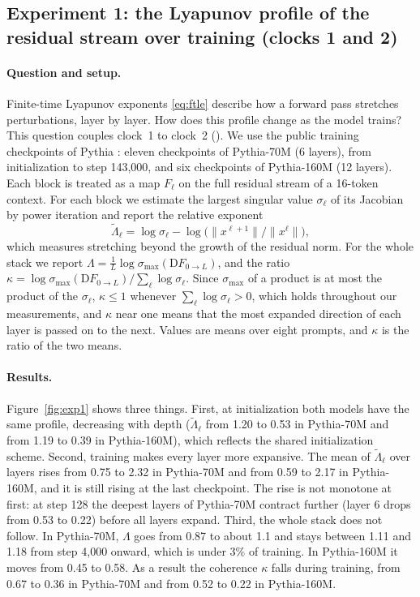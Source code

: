 \subsection{Experiment 1: the Lyapunov profile of the residual stream over training (clocks 1 and 2)}
\label{sec:exp1}

\paragraph{Question and setup.} Finite-time Lyapunov exponents \eqref{eq:ftle} describe how a forward pass stretches perturbations, layer by layer. How does this profile change as the model trains? This question couples clock~1 to clock~2 (). We use the public training checkpoints of Pythia \citep{biderman2023pythia}: eleven checkpoints of Pythia-70M (6 layers), from initialization to step 143{,}000, and six checkpoints of Pythia-160M (12 layers). Each block is treated as a map $F_\ell$ on the full residual stream of a 16-token context. For each block we estimate the largest singular value $\sigma_\ell$ of its Jacobian by power iteration and report the relative exponent
\begin{equation}
\tilde\Lambda_\ell=\log\sigma_\ell-\log\big(\|x^{\ell+1}\|/\|x^{\ell}\|\big),
\end{equation}
which measures stretching beyond the growth of the residual norm. For the whole stack we report $\Lambda=\frac{1}{L}\log\sigma_{\max}(\mathrm{D}F_{0\to L})$, and the ratio $\kappa=\log\sigma_{\max}(\mathrm{D}F_{0\to L})/\sum_\ell\log\sigma_\ell$. Since $\sigma_{\max}$ of a product is at most the product of the $\sigma_\ell$, $\kappa\le1$ whenever $\sum_\ell\log\sigma_\ell>0$, which holds throughout our measurements, and $\kappa$ near one means that the most expanded direction of each layer is passed on to the next. Values are means over eight prompts, and $\kappa$ is the ratio of the two means.

\paragraph{Results.} Figure~\ref{fig:exp1} shows three things. First, at initialization both models have the same profile, decreasing with depth ($\tilde\Lambda_\ell$ from 1.20 to 0.53 in Pythia-70M and from 1.19 to 0.39 in Pythia-160M), which reflects the shared initialization scheme. Second, training makes every layer more expansive. The mean of $\tilde\Lambda_\ell$ over layers rises from 0.75 to 2.32 in Pythia-70M and from 0.59 to 2.17 in Pythia-160M, and it is still rising at the last checkpoint. The rise is not monotone at first: at step 128 the deepest layers of Pythia-70M contract further (layer 6 drops from 0.53 to 0.22) before all layers expand. Third, the whole stack does not follow. In Pythia-70M, $\Lambda$ goes from 0.87 to about 1.1 and stays between 1.11 and 1.18 from step 4{,}000 onward, which is under 3\% of training. In Pythia-160M it moves from 0.45 to 0.58. As a result the coherence $\kappa$ falls during training, from 0.67 to 0.36 in Pythia-70M and from 0.52 to 0.22 in Pythia-160M.

